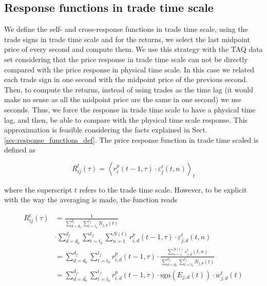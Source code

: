 \subsection{Response functions in trade time scale}
\label{subsec:response_function_trade}

We define the self- and cross-response functions in trade time scale, using the
trade signs in trade time scale and for the returns, we select the last
midpoint price of every second and compute them. We use this strategy with the
TAQ data set considering that the price response in trade time scale can not
be directly compared with the price response in physical time scale. In this
case we related each trade sign in one second with the midpoint price of the
previous second. Then, to compute the returns, instead of using trades as the
time lag (it would make no sense as all the midpoint price are the same in one
second) we use seconds. Thus, we force the response in trade time scale to have
a physical time lag, and then, be able to compare with the physical time scale
response. This approximation is feasible considering the facts explained in
Sect. \ref{sec:response_functions_def}. The price response function in trade
time scaled is defined as

\begin{equation}\label{eq:response_functions_trade_scale_general}
    R^{t}_{ij}\left(\tau\right)=\left\langle r^{p}_{i}\left(t-1,\tau
    \right)\cdot\varepsilon_{j}^{t} \left(t, n\right)\right\rangle _{t}
\end{equation}

where the superscript $t$ refers to the trade time scale. However, to be
explicit with the way the averaging is made, the function reads

\begin{align}\label{eq:response_trades_explicit}
    R_{ij}^{t}\left(\tau\right)&=\frac{1}{\sum_{d=d_{0}}^{d_{f}}
    \sum_{t=t_{0}}^{t_{f}}N_{j,d} \left(t \right)} \nonumber \\
    &\cdot\sum_{d=d_{0}}^{d_{f}}\sum_{t=t_{0}}^{t_{f}}\sum_{n=1}
    ^{N\left(t\right)} r^{p}_{i,d}\left(t-1, \tau\right)\cdot
    \varepsilon_{j,d}^{t}\left(t,n\right)\\
    &=\sum_{d=d_{0}}^{d_{f}}\sum_{t=t_{0}}^{t_{f}} r^{p}_{i,d}
    \left(t-1,\tau\right) \cdot\frac{\sum_{n=1}^{N\left(t\right)}
    \varepsilon_{j,d}^{t}\left(t,n \right)} {\sum_{d=d_{0}}^{d_{f}}
    \sum_{t=t_{0}}^{t_{f}}N_{j,d}\left(t\right)} \nonumber \\
    &=\sum_{d=d_{0}}^{d_{f}}\sum_{t=t_{0}}^{t_{f}}r^{p}_{i,d}
    \left(t-1,\tau\right) \cdot \text{sgn}\left(E_{j,d}\left(t\right)\right)
    \cdot w_{j,d}^{t}\left(t\right)
\end{align}

